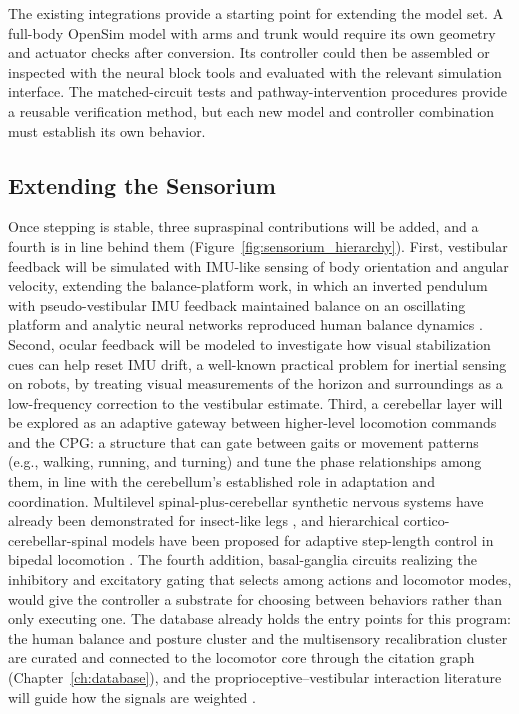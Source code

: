 The existing integrations provide a starting point for extending the model set. A full-body OpenSim model with arms and trunk would require its own geometry and actuator checks after conversion. Its controller could then be assembled or inspected with the neural block tools and evaluated with the relevant simulation interface. The matched-circuit tests and pathway-intervention procedures provide a reusable verification method, but each new model and controller combination must establish its own behavior.

\subsection{Extending the Sensorium}\label{sec:fw_senses}

Once stepping is stable, three supraspinal contributions will be added, and a fourth is in line behind them (Figure~\ref{fig:sensorium_hierarchy}). First, vestibular feedback will be simulated with IMU-like sensing of body orientation and angular velocity, extending the balance-platform work, in which an inverted pendulum with pseudo-vestibular IMU feedback maintained balance on an oscillating platform \citep{bolen_balance_2024, bolen_selfbalancing_2024, bolen_selfbalancing_srs_2024} and analytic neural networks reproduced human balance dynamics \citep{hilts_dynamic_2019}. Second, ocular feedback will be modeled to investigate how visual stabilization cues can help reset IMU drift, a well-known practical problem for inertial sensing on robots, by treating visual measurements of the horizon and surroundings as a low-frequency correction to the vestibular estimate. Third, a cerebellar layer will be explored as an adaptive gateway between higher-level locomotion commands and the CPG: a structure that can gate between gaits or movement patterns (e.g., walking, running, and turning) and tune the phase relationships among them, in line with the cerebellum's established role in adaptation and coordination. Multilevel spinal-plus-cerebellar synthetic nervous systems have already been demonstrated for insect-like legs \citep{grummer_multilevel_2024}, and hierarchical cortico-cerebellar-spinal models have been proposed for adaptive step-length control in bipedal locomotion \citep{chen_corticocerebellar_2025}. The fourth addition, basal-ganglia circuits realizing the inhibitory and excitatory gating that selects among actions and locomotor modes, would give the controller a substrate for choosing between behaviors rather than only executing one. The database already holds the entry points for this program: the human balance and posture cluster and the multisensory recalibration cluster are curated and connected to the locomotor core through the citation graph (Chapter~\ref{ch:database}), and the proprioceptive--vestibular interaction literature will guide how the signals are weighted \citep{akay_relative_2021}.

